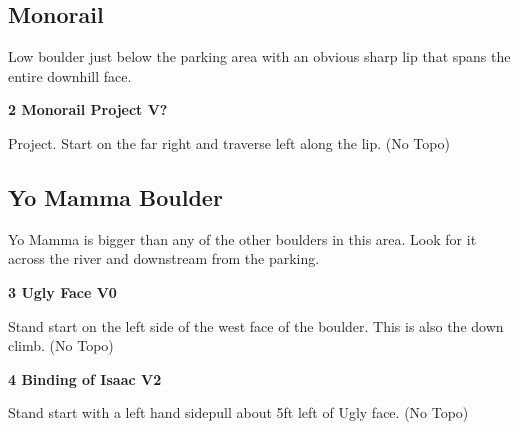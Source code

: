 \begin{multicols}{2}
\begin{minipage}{\columnwidth}
			\subsection*{Monorail}\label{bf:Monorail}
			Low boulder just below the parking area with an obvious sharp lip that spans the entire downhill face.
			
			\end{minipage}
			
					\begin{minipage}{\linewidth}	
					\label{rt:Monorail Project}
\colorbox{black!20}{
\parbox{0.95\textwidth}{
\textbf{
2 Monorail Project V?  
}
}
}

					\begin{adjustwidth}{0.5cm}{}				
					Project. Start on the far right and traverse left along the lip.
						\newline (No Topo) 
					\end{adjustwidth}
					\end{minipage}
			\begin{minipage}{\columnwidth}
			\subsection*{Yo Mamma Boulder}\label{bf:Yo Mamma Boulder}
			Yo Mamma is bigger than any of the other boulders in this area. Look for it across the river and downstream from the parking.
			
			\end{minipage}
			
					\begin{minipage}{\linewidth}	
					\label{rt:Ugly Face}
\colorbox{green!20}{
\parbox{0.95\textwidth}{
\textbf{
3 Ugly Face V0   \warn 
}
}
}

					\begin{adjustwidth}{0.5cm}{}				
					Stand start on the left side of the west face of the boulder. This is also the down climb.
						\newline (No Topo) 
					\end{adjustwidth}
					\end{minipage}
					\begin{minipage}{\linewidth}	
					\label{rt:Binding of Isaac}
\colorbox{green!20}{
\parbox{0.95\textwidth}{
\textbf{
4 Binding of Isaac V2    \warn 
}
}
}

					\begin{adjustwidth}{0.5cm}{}				
					Stand start with a left hand sidepull about 5ft left of Ugly face.
						\newline (No Topo) 
					\end{adjustwidth}
					\end{minipage}
			\begin{minipage}{\columnwidth}

\end{minipage}
\end{multicols}
